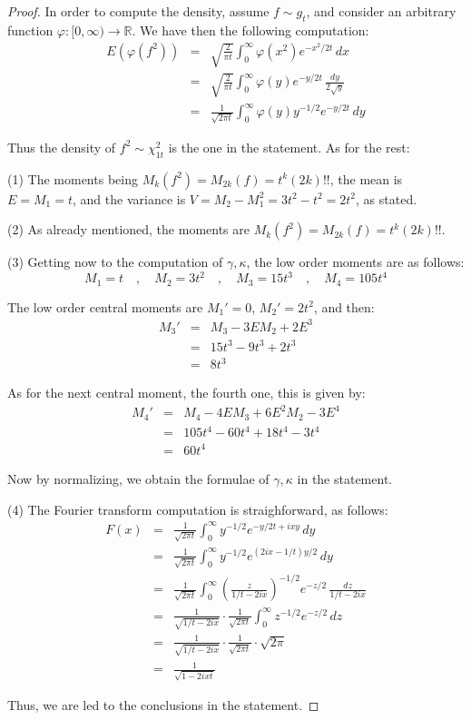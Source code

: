 \documentclass[12pt]{amsbook}
\begin{document}
\begin{proof}
In order to compute the density, assume $f\sim g_t$, and consider an arbitrary function $\varphi:[0,\infty)\to\mathbb R$. We have then the following computation:
\begin{eqnarray*}
E(\varphi(f^2))
&=&\sqrt{\frac{2}{\pi t}}\int_0^\infty\varphi(x^2)e^{-x^2/2t}\,dx\\
&=&\sqrt{\frac{2}{\pi t}}\int_0^\infty\varphi(y)e^{-y/2t}\,\frac{dy}{2\sqrt{y}}\\
&=&\frac{1}{\sqrt{2\pi t}}\int_0^\infty\varphi(y)y^{-1/2}e^{-y/2t}\,dy
\end{eqnarray*}

Thus the density of $f^2\sim\chi_{1t}^2$ is the one in the statement. As for the rest:

\medskip

(1) The moments being $M_k(f^2)=M_{2k}(f)=t^k(2k)!!$, the mean is $E=M_1=t$, and the variance is $V=M_2-M_1^2=3t^2-t^2=2t^2$, as stated.

\medskip

(2) As already mentioned, the moments are $M_k(f^2)=M_{2k}(f)=t^k(2k)!!$.

\medskip

(3) Getting now to the computation of $\gamma,\kappa$, the low order moments are as follows:
$$M_1=t\quad,\quad M_2=3t^2\quad,\quad 
M_3=15t^3\quad,\quad M_4=105t^4$$

The low order central moments are $M_1'=0$, $M_2'=2t^2$, and then:
\begin{eqnarray*}
M_3'
&=&M_3-3EM_2+2E^3\\
&=&15t^3-9t^3+2t^3\\
&=&8t^3
\end{eqnarray*} 

As for the next central moment, the fourth one, this is given by:
\begin{eqnarray*}
M_4'
&=&M_4-4EM_3+6E^2M_2-3E^4\\
&=&105t^4-60t^4+18t^4-3t^4\\
&=&60t^4
\end{eqnarray*} 

Now by normalizing, we obtain the formulae of $\gamma,\kappa$ in the statement.

\medskip

(4) The Fourier transform computation is straighforward, as follows:
\begin{eqnarray*}
F(x)
&=&\frac{1}{\sqrt{2\pi t}}\int_0^\infty y^{-1/2}e^{-y/2t+ixy}\,dy\\
&=&\frac{1}{\sqrt{2\pi t}}\int_0^\infty y^{-1/2}e^{(2ix-1/t)y/2}\,dy\\
&=&\frac{1}{\sqrt{2\pi t}}\int_0^\infty\left(\frac{z}{1/t-2ix}\right)^{-1/2}e^{-z/2}\,\frac{dz}{1/t-2ix}\\
&=&\frac{1}{\sqrt{1/t-2ix}}\cdot\frac{1}{\sqrt{2\pi t}}\int_0^\infty z^{-1/2}e^{-z/2}\,dz\\
&=&\frac{1}{\sqrt{1/t-2ix}}\cdot\frac{1}{\sqrt{2\pi t}}\cdot\sqrt{2\pi}\\
&=&\frac{1}{\sqrt{1-2ixt}}
\end{eqnarray*}

Thus, we are led to the conclusions in the statement.
\end{proof}
\end{document}
